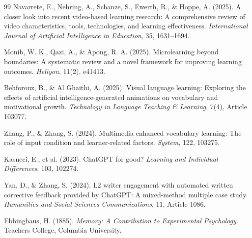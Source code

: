 \documentclass[Afour,sageapa,times]{sagej}
\begin{document}
\begin{thebibliography}{99}
Navarrete, E., Nehring, A., Schanze, S., Ewerth, R., \& Hoppe, A. (2025). A closer look into recent video-based learning research: A comprehensive review of video characteristics, tools, technologies, and learning effectiveness. \textit{International Journal of Artificial Intelligence in Education}, 35, 1631--1694.

Monib, W. K., Qazi, A., \& Apong, R. A. (2025). Microlearning beyond boundaries: A systematic review and a novel framework for improving learning outcomes. \textit{Heliyon}, 11(2), e41413.

Behforouz, B., \& Al Ghaithi, A. (2025). Visual language learning: Exploring the effects of artificial intelligence-generated animations on vocabulary and motivational growth. \textit{Technology in Language Teaching \& Learning}, 7(4), Article 103077.

Zhang, P., \& Zhang, S. (2024). Multimedia enhanced vocabulary learning: The role of input condition and learner-related factors. \textit{System}, 122, 103275.

Kasneci, E., et al. (2023). ChatGPT for good? \textit{Learning and Individual Differences}, 103, 102274.

Yan, D., \& Zhang, S. (2024). L2 writer engagement with automated written corrective feedback provided by ChatGPT: A mixed-method multiple case study. \textit{Humanities and Social Sciences Communications}, 11, Article 1086.

Ebbinghaus, H. (1885). \textit{Memory: A Contribution to Experimental Psychology}. Teachers College, Columbia University.

\end{thebibliography}
\end{document}
